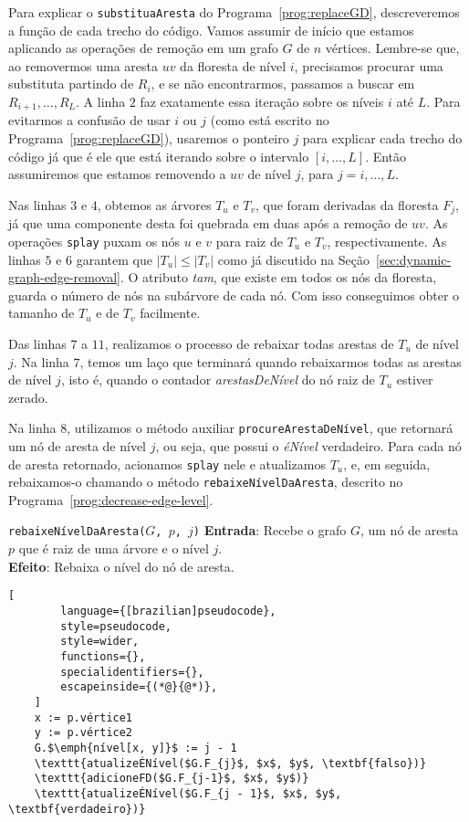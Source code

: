 Para explicar o \texttt{substituaAresta} do Programa~\ref{prog:replaceGD}, descreveremos a função de cada trecho do código. Vamos assumir de início que estamos aplicando as operações de remoção em um grafo $G$ de $n$ vértices. Lembre-se que, ao removermos uma aresta $uv$ da floresta de nível $i$, precisamos procurar uma substituta partindo de $R_i$, e se não encontrarmos, passamos a buscar em $R_{i + 1}, \ldots, R_L$. A linha $2$ faz exatamente essa iteração sobre os níveis $i$ até $L$. Para evitarmos a confusão de usar $i$ ou $j$ (como está escrito no Programa~\ref{prog:replaceGD}), usaremos o ponteiro $j$ para explicar cada trecho do código já que é ele que está iterando sobre o intervalo $[i, \ldots, L]$. Então assumiremos que estamos removendo a $uv$ de nível $j$, para $j = i, \ldots , L$.

Nas linhas $3$ e $4$, obtemos as árvores $T_u$ e $T_v$, que foram derivadas da floresta $F_j$, já que uma componente desta foi quebrada em duas após a remoção de $uv$. As operações \texttt{splay} puxam os nós $u$ e $v$ para raiz de $T_u$ e $T_v$, respectivamente. As linhas $5$ e $6$ garantem que $|T_u| \leq |T_v|$ como já discutido na Seção~\ref{sec:dynamic-graph-edge-removal}. O atributo \textit{tam}, que existe em todos os nós da floresta, guarda o número de nós na subárvore de cada nó. Com isso conseguimos obter o tamanho de $T_u$ e de $T_v$ facilmente.

Das linhas $7$ a $11$, realizamos o processo de rebaixar todas arestas de $T_u$ de nível $j$. Na linha $7$, temos um laço que terminará quando rebaixarmos todas as arestas de nível $j$, isto é, quando o contador \textit{arestasDeNível} do nó raiz de $T_u$ estiver zerado. 

Na linha $8$, utilizamos o método auxiliar \texttt{procureArestaDeNível}, que retornará um nó de aresta de nível $j$, ou seja, que possui o \textit{éNível} verdadeiro. Para cada nó de aresta retornado, acionamos \texttt{splay} nele e atualizamos $T_u$, e, em seguida, rebaixamos-o chamando o método \texttt{rebaixeNívelDaAresta}, descrito no Programa~\ref{prog:decrease-edge-level}.

\begin{programruledcaption}{\texttt{rebaixeNívelDaAresta($G$, $p$, $j$)} \label{prog:decrease-edge-level}}
    \noindent\textbf{Entrada}: Recebe o grafo $G$, um nó de aresta $p$ que é raiz de uma árvore e o nível $j$.\\
    \textbf{Efeito}: Rebaixa o nível do nó de aresta.
    \vspace{-0.5\baselineskip}
    \begin{lstlisting}[
        language={[brazilian]pseudocode},
        style=pseudocode,
        style=wider,
        functions={},
        specialidentifiers={},
        escapeinside={(*@}{@*)},
    ]
    x := p.vértice1
    y := p.vértice2
    G.$\emph{nível[x, y]}$ := j - 1
    \texttt{atualizeÉNível($G.F_{j}$, $x$, $y$, \textbf{falso})}
    \texttt{adicioneFD($G.F_{j-1}$, $x$, $y$)}
    \texttt{atualizeÉNível($G.F_{j - 1}$, $x$, $y$, \textbf{verdadeiro})}

    \end{lstlisting}
    \vspace{-0.5\baselineskip}
\end{programruledcaption}

